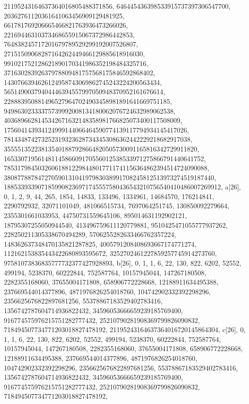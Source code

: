 {{{   21195243164637364016805488371856, 646445436398533915737397306547700, 
   20362761120361641063456909129481925, 661781769206665466821763936473266026, 
   22169446310373468655915067372986442853, 
   764838245717201679789529299192007526807, 
   27151509068287164262449466129885618916030, 
   991021752128621890170341986352198484325716, 
   37163028392637978809481757568175846592868402, 
   1430766394626124958743069862745243224200563434, 
   56514900379404446394557997050948370952161676614, 
   2288839508814965279647024903458981891641669751185, 
   94986302333375739992008134180062076724632989062538, 
   4036896628145342671632148358981766825073400117508009, 
   175604143934124999144066464590774139117794934145417026, 
   7814348742732523193236287343453086362442229218682917038, 
   355551352238135401887928664820505730091165816342729911820, 
   16533071956148114586609170556012538533971275866791440641752, 
   785317984503260618812298448017711741156364862394514724090088, 
   38087788784727059013104197983038991708245812513973274519187440, 
   1885339339071859908236971745557580436543210756540410486007269912}}, 
 {a[26], {0, 1, 2, 9, 44, 265, 1854, 14833, 133496, 1334961, 14684570, 
   176214841, 2290792932, 32071101049, 481066515734, 7697064251745, 
   130850092279664, 2355301661033953, 44750731559645106, 895014631192902121, 
   18795307255050944540, 413496759611120779881, 9510425471055777937262, 
   228250211305338670494289, 5706255282633466762357224, 
   148362637348470135821287825, 4005791208408693667174771274, 
   112162153835443422680893595672, 3252702461227859257745914273760, 
   97581073836835777732377427928893}}, 
 {b[26], {0, 1, 1, 6, 22, 130, 822, 6202, 52552, 499194, 5238370, 60222844, 
   752587764, 10157945044, 147267180508, 2282355168060, 37655004171808, 
   658906772228668, 12188911634495388, 237669544014377896, 
   4871976826254018760, 104742902332392298296, 2356625676822897681256, 
   55378867183529402783416, 1356742787604714936822432, 
   34596053666659239185769400, 916774575976215751282777432, 
   25210790281908369799826090832, 718494507734771203018827478192, 
   21195243164637364016720145864304}}, 
 {c[26], {0, 1, 1, 6, 22, 130, 822, 6202, 52552, 499194, 5238370, 60222844, 
   752587764, 10157945044, 147267180508, 2282355168060, 37655004171808, 
   658906772228668, 12188911634495388, 237669544014377896, 
   4871976826254018760, 104742902332392298296, 2356625676822897681256, 
   55378867183529402783416, 1356742787604714936822432, 
   34596053666659239185769400, 916774575976215751282777432, 
   25210790281908369799826090832, 718494507734771203018827478192, 
}}}
